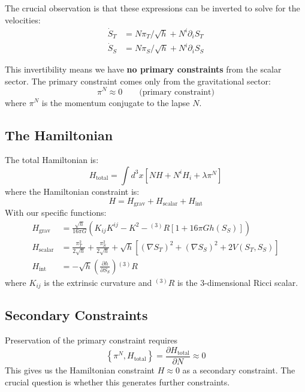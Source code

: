 \documentclass[12pt]{article}
\begin{document}
The crucial observation is that these expressions can be inverted to solve for the velocities:
\begin{align}
\dot{S}_T &= N\pi_T/\sqrt{h} + N^i \partial_i S_T \\
\dot{S}_S &= N\pi_S/\sqrt{h} + N^i \partial_i S_S
\end{align}

This invertibility means we have \textbf{no primary constraints} from the scalar sector. The primary constraint comes only from the gravitational sector:
\begin{equation}
\pi^N \approx 0 \qquad \text{(primary constraint)}
\end{equation}
where $\pi^N$ is the momentum conjugate to the lapse $N$.

\subsection{The Hamiltonian}

The total Hamiltonian is:
\begin{equation}
H_{\text{total}} = \int d^3x \left[ N H + N^i H_i + \lambda \pi^N \right]
\end{equation}
where the Hamiltonian constraint is:
\begin{equation}
H = H_{\text{grav}} + H_{\text{scalar}} + H_{\text{int}}
\end{equation}
With our specific functions:
\begin{align}
H_{\text{grav}} &= \frac{\sqrt{h}}{16\pi G}\left( K_{ij} K^{ij} - K^2 - {}^{(3)}R [1 + 16\pi G h(S_S)] \right) \\
H_{\text{scalar}} &= \frac{\pi_T^2}{2\sqrt{h}} + \frac{\pi_S^2}{2\sqrt{h}} + \sqrt{h}\left[ (\nabla S_T)^2 + (\nabla S_S)^2 + 2V(S_T,S_S) \right] \\
H_{\text{int}} &= - \sqrt{h} \left( \frac{\partial h}{\partial S_S} \right) {}^{(3)}R
\end{align}
where $K_{ij}$ is the extrinsic curvature and ${}^{(3)}R$ is the 3-dimensional Ricci scalar.

\subsection{Secondary Constraints}

Preservation of the primary constraint requires
\begin{equation}
\left\{ \pi^N, H_{\text{total}} \right\} = \frac{\partial H_{\text{total}}}{\partial N} \approx 0
\end{equation}
This gives us the Hamiltonian constraint $H \approx 0$ as a secondary constraint. The crucial question is whether this generates further constraints.
\end{document}
